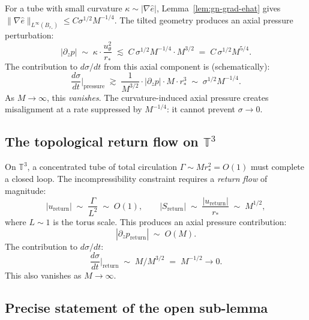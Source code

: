 \documentclass[11pt]{article}
\theoremstyle{definition}
\theoremstyle{remark}
\begin{document}
For a tube with small curvature $\kappa \sim |\nabla\hat{e}|$,
Lemma~\ref{lem:gn-grad-ehat} gives $\|\nabla\hat{e}\|_{L^\infty(B_{r_*})} \le
C\sigma^{1/2}M^{-1/4}$.  The tilted geometry produces an axial pressure perturbation:
\begin{equation}\label{eq:axial-pressure}
  |\partial_z p| \;\sim\; \kappa \cdot \frac{u_\theta^2}{r_*}
  \;\lesssim\; C\,\sigma^{1/2} M^{-1/4} \cdot M^{3/2}
  \;=\; C\,\sigma^{1/2} M^{5/4}.
\end{equation}
The contribution to $d\sigma/dt$ from this axial component is (schematically):
\[
  \frac{d\sigma}{dt}\bigg|_{\text{pressure}}
  \;\gtrsim\;
  \frac{1}{M^{3/2}} \cdot |\partial_z p| \cdot M \cdot r_*^3
  \;\sim\; \sigma^{1/2} M^{-1/4}.
\]
As $M\to\infty$, this \emph{vanishes}.  The curvature-induced axial pressure creates
misalignment at a rate suppressed by $M^{-1/4}$: it cannot prevent $\sigma \to 0$.

\subsection{The topological return flow on $\mathbb{T}^3$}

On $\mathbb{T}^3$, a concentrated tube of total circulation $\Gamma \sim M r_*^2 = O(1)$
must complete a closed loop.  The incompressibility constraint requires a
\emph{return flow} of magnitude:
\[
  |u_{\mathrm{return}}| \;\sim\; \frac{\Gamma}{L^2} \;\sim\; O(1),
  \qquad
  |S_{\mathrm{return}}| \;\sim\; \frac{|u_{\mathrm{return}}|}{r_*}
  \;\sim\; M^{1/2},
\]
where $L\sim 1$ is the torus scale.  This produces an axial pressure contribution:
\[
  |\partial_z p_{\mathrm{return}}| \;\sim\; O(M).
\]
The contribution to $d\sigma/dt$:
\[
  \frac{d\sigma}{dt}\bigg|_{\mathrm{return}}
  \;\sim\; M / M^{3/2} \;=\; M^{-1/2} \to 0.
\]
This also vanishes as $M\to\infty$.

\subsection{Precise statement of the open sub-lemma}
\end{document}
